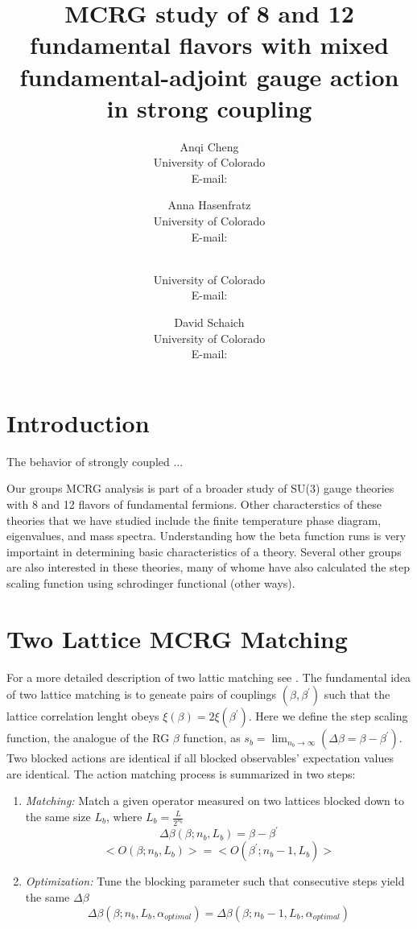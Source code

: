 \documentclass{PoS}
\title{MCRG study of 8 and 12 fundamental flavors with mixed fundamental-adjoint gauge action in strong coupling}
\author{Anqi Cheng\\
        University of Colorado\\
        E-mail: \email{chenganqi498@gmail.com}}
\author{Anna Hasenfratz\\
        University of Colorado\\
        E-mail: \email{anna@eotvos.colorado.edu}}
\author{\speaker{Gregory Petropoulos}\\
        University of Colorado\\
        E-mail: \email{gregory.petropoulos@colorado.edu}}
\author{David Schaich\\
        University of Colorado\\
        E-mail: \email{daschaich@gmail.com}}
\begin{document}
\section{Introduction}
The behavior of strongly coupled ...

Our groups MCRG analysis is part of a broader study of SU(3) gauge theories with 8 and 12 flavors of fundamental fermions.  Other characterstics of these theories that we have studied include the finite temperature phase diagram, eigenvalues, and mass spectra.  Understanding how the beta function runs is very importaint in determining basic characteristics of a theory.  Several other groups are also interested in these theories, many of whome have also calculated the step scaling function using schrodinger functional (other ways).  

\section{Two Lattice MCRG Matching}
For a more detailed description of two lattic matching see \cite{annaMCRG}.  The fundamental idea of two lattice matching is to geneate pairs of couplings $(\beta, \beta^{\prime})$ such that the lattice correlation lenght obeys $\xi(\beta)=2\xi(\beta^{\prime})$.  Here we define the step scaling function, the analogue of the RG $\beta$ function, as $s_b= \lim_{n_b\to\infty}(\Delta\beta=\beta - \beta^{\prime})$.  Two blocked actions are identical if all blocked observables' expectation values are identical.  The action matching process is summarized in two steps:

\begin{enumerate}
\item \emph{Matching:}  Match a given operator measured on two lattices blocked down to the same size $L_b$, where $L_b=\frac{L}{2^{n_b}}$
\begin{equation}
\Delta\beta(\beta;n_b,L_b)=\beta-\beta^{\prime}
\end{equation}
\begin{equation}
<O(\beta;n_b,L_b)>=<O(\beta^{\prime};n_b-1,L_b)>
\end{equation}
\item \emph{Optimization:}  Tune the blocking parameter such that consecutive steps yield the same $\Delta\beta$
\begin{equation}
\Delta\beta(\beta;n_b,L_b,\alpha_{optimal})=\Delta\beta(\beta;n_b-1,L_b,\alpha_{optimal})
\end{equation}
\end{enumerate}
\end{document}
